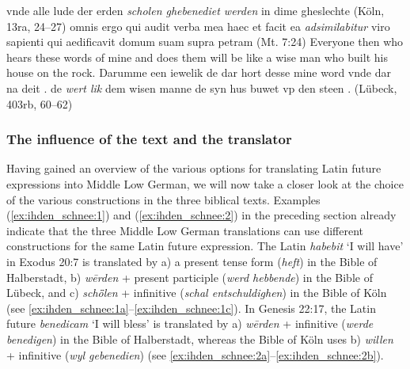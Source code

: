 \documentclass[output=paper,colorlinks,citecolor=brown]{langscibook}
\begin{document}
\ex vnde alle lude der erden \textit{scholen ghebenediet werden} in dime gheslechte (Köln, 13ra, 24--27)\label{ex:ihden_schnee:5b}
\z
\z
{} %
\ea omnis ergo qui audit verba mea haec et facit ea \textit{adsimilabitur} viro sapienti qui aedificavit domum suam supra petram (Mt. 7:24) \label{ex:ihden_schnee:6}
\exi{} Everyone then who hears these words of mine and does them will be like a wise man who built his house on the rock.
\ea  Darumme een iewelik de dar hort desse mine word vnde dar na deit . de \textit{wert lik} dem wisen manne de syn hus buwet vp den steen . (Lübeck, 403rb, 60--62)\label{ex:ihden_schnee:6a}
\z
\z

\subsubsection{The influence of the text and the translator}\label{chap:translator}

\largerpage[-0.5]

Having gained an overview of the various options for translating Latin future expressions into Middle Low German, we will now take a closer look at the choice of the various constructions in the three biblical texts. Examples (\ref{ex:ihden_schnee:1}) and (\ref{ex:ihden_schnee:2}) in the preceding section already indicate that the three Middle Low German translations can use different constructions for the same Latin future expression. The Latin \textit{habebit} `I will have' in Exodus 20:7 is translated by a) a present tense form (\textit{heft}) in the Bible of Halberstadt, b) \textit{wērden} + present participle (\textit{werd hebbende}) in the Bible of Lübeck, and c) \textit{schȫlen} + infinitive (\textit{schal entschuldighen}) in the Bible of Köln (see \ref{ex:ihden_schnee:1a}--\ref{ex:ihden_schnee:1c}). In Genesis 22:17, the Latin future \textit{benedicam} `I will bless' is translated by a) \textit{wērden} + infinitive (\textit{werde benedigen}) in the Bible of Halberstadt, whereas the Bible of Köln uses b) \textit{willen} + infinitive (\textit{wyl gebenedien}) (see \ref{ex:ihden_schnee:2a}--\ref{ex:ihden_schnee:2b}).
\end{document}
